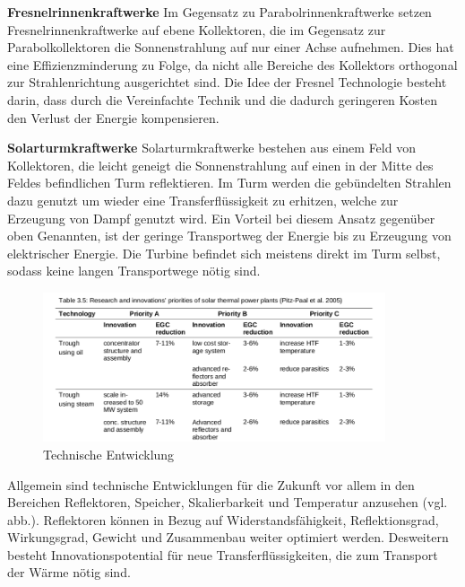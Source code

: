 \textbf{Fresnelrinnenkraftwerke} 
\newline
Im Gegensatz zu Parabolrinnenkraftwerke setzen Fresnelrinnenkraftwerke auf ebene Kollektoren, die im Gegensatz zur Parabolkollektoren die Sonnenstrahlung auf nur einer Achse aufnehmen. Dies hat eine Effizienzminderung zu Folge, da nicht alle Bereiche des Kollektors orthogonal zur Strahlenrichtung ausgerichtet sind. Die Idee der Fresnel Technologie besteht darin, dass durch die Vereinfachte Technik und die dadurch geringeren Kosten den Verlust der Energie kompensieren.

\textbf{Solarturmkraftwerke}
\newline
Solarturmkraftwerke bestehen aus einem Feld von  Kollektoren, die leicht geneigt die Sonnenstrahlung auf einen in der Mitte des Feldes befindlichen Turm reflektieren. Im Turm werden die gebündelten Strahlen dazu genutzt um wieder eine Transferflüssigkeit zu erhitzen, welche zur Erzeugung von Dampf genutzt wird. Ein Vorteil bei diesem Ansatz gegenüber oben Genannten, ist der geringe Transportweg der Energie bis zu Erzeugung von elektrischer Energie. Die Turbine befindet sich meistens direkt im Turm selbst, sodass keine langen Transportwege nötig sind.
\newline

\begin{figure}[H]
	\centering
	\includegraphics[width=0.9\textwidth]{technische_entwicklung1.png}
	\caption{Technische Entwicklung}
	\label{fig:technik_e1}
\end{figure}

Allgemein sind technische Entwicklungen für die Zukunft vor allem in den Bereichen Reflektoren, Speicher, Skalierbarkeit und Temperatur anzusehen (vgl. abb.).
\newline
Reflektoren können in Bezug auf Widerstandsfähigkeit, Reflektionsgrad, Wirkungsgrad, Gewicht und Zusammenbau weiter optimiert werden. Desweitern besteht Innovationspotential für neue Transferflüssigkeiten, die zum Transport der Wärme nötig sind.

